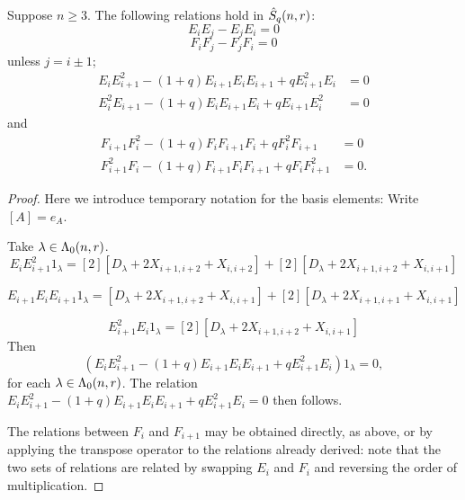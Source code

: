 \documentclass[a4paper, 11pt]{report}
\begin{document}
\begin{lemma}
Suppose $n\geq 3$. The following relations hold in $\hat{S}_q(n,r)$:
\begin{equation*}
E_i E_j - E_j E_i = 0
\end{equation*}
\begin{equation*}
F_i F_j - F_j F_i = 0
\end{equation*}
unless $j=i\pm 1$;
\begin{align*}
E_i E_{i+1}^2 - (1+q)E_{i+1} E_i E_{i+1} + qE_{i+1}^2 E_i &= 0\\
E_i^2 E_{i+1} - (1+q)E_i E_{i+1} E_i + qE_{i+1} E_i^2 &= 0
\end{align*}
and
\begin{align*}
F_{i+1} F_i^2 - (1+q) F_i F_{i+1} F_i + qF_i^2 F_{i+1} &=0\\
F_{i+1}^2 F_i - (1+q) F_{i+1} F_i F_{i+1} + q F_i F_{i+1}^2 &= 0.
\end{align*}
\end{lemma}
\begin{proof}
Here we introduce temporary notation for the basis elements: Write $[ A] = e_A$.

Take $\lambda\in\Lambda_0(n,r)$.
\begin{equation*}
E_i E_{i+1}^2 1_\lambda = [2][ {D_\lambda + 2X_{i+1,i+2} + X_{i,i+2} }] + [2][ { D_\lambda + 2X_{i+1,i+2} + X_{i,i+1} }]
\end{equation*}                                                                                                                                                                                                                                                                                                                                      

\begin{equation*}
E_{i+1} E_i E_{i+1} 1_\lambda = [ {D_\lambda + 2X_{i+1,i+2} + X_{i,i+1} } ] + [2][ { D_\lambda + 2X_{i+1,i+1} + X_{i,i+1} } ]
\end{equation*}

\begin{equation*}
E_{i+1}^2 E_i 1_\lambda = [2][ { D_\lambda + 2X_{i+1,i+2} + X_{i,i+1} } ]
\end{equation*}
Then
\begin{equation*}
(E_i E_{i+1}^2 - (1+q)E_{i+1} E_i E_{i+1} + qE_{i+1}^2 E_i)1_\lambda = 0,
\end{equation*}
for each $\lambda\in\Lambda_0(n,r)$. The relation $E_i E_{i+1}^2 - (1+q)E_{i+1} E_i E_{i+1} + qE_{i+1}^2 E_i = 0$ then follows.


The relations between $F_i$ and $F_{i+1}$ may be obtained directly, as above, or by applying the transpose operator to the relations already derived: note that the two sets of relations are related by swapping $E_i$ and $F_i$ and reversing the order of multiplication.
\end{proof}
\end{document}
